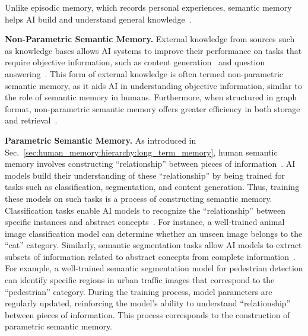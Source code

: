 \documentclass[journal,hideappendix]{vgtc}
\newenvironment{j_itemize}{
\begin{itemize}[]
  \setlength{\itemsep}{3pt}
  \setlength{\parskip}{0pt}
  \setlength{\parsep}{0pt}
}{\end{itemize}}
\begin{document}
Unlike episodic memory, which records personal experiences, semantic memory helps AI build and understand general knowledge~\cite{tulving1972episodic,wang2016semantic}.

\begin{j_itemize}

    \item[$\bullet$] \textbf{Non-Parametric Semantic Memory.} External knowledge from sources such as knowledge bases allows AI systems to improve their performance on tasks that require objective information, such as content generation~\cite{trisedya2020sentence,wenhu2022reimage,yu2022survey,rongjie2023makeanaudio} and question answering~\cite{qa2020karpukhin,xixin2022gmtkbqa,yang2023care,luo2023chatkbqa}. This form of external knowledge is often termed non-parametric semantic memory, as it aids AI in understanding objective information, similar to the role of semantic memory in humans. Furthermore, when structured in graph format, non-parametric semantic memory offers greater efficiency in both storage and retrieval~\cite{edge2024local,gutierrez2024hipporag}.

    \item[$\bullet$] \textbf{Parametric Semantic Memory.} As introduced in Sec.~\ref{sec:human_memory:hierarchy:long_term_memory}, human semantic memory involves constructing ``relationship'' between pieces of information~\cite{shiffrin1969memory,tulving1972episodic}. AI models build their understanding of these ``relationship'' by being trained for tasks such as classification, segmentation, and content generation. Thus, training these models on such tasks is a process of constructing semantic memory. Classification tasks enable AI models to recognize the ``relationship'' between specific instances and abstract concepts~\cite{he2016deep,li2021survey,nandwani2021review}. For instance, a well-trained animal image classification model can determine whether an unseen image belongs to the ``cat'' category. Similarly, semantic segmentation tasks allow AI models to extract subsets of information related to abstract concepts from complete information~\cite{long2015fully,guo2018review}. For example, a well-trained semantic segmentation model for pedestrian detection can identify specific regions in urban traffic images that correspond to the ``pedestrian'' category.
    During the training process, model parameters are regularly updated, reinforcing the model's ability to understand ``relationship'' between pieces of information. This process corresponds to the construction of parametric semantic memory.
    
\end{j_itemize}
\end{document}
